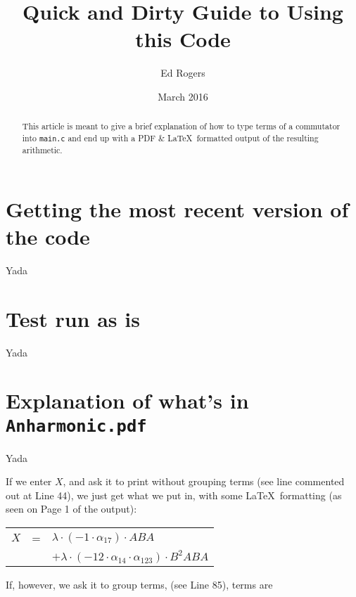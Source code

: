 \documentclass{article}
\title{Quick and Dirty Guide to Using this Code}
\author{Ed Rogers}
\date{March 2016}
\begin{document}
   \maketitle

\begin{abstract}
This article is meant to give a brief explanation of how to type terms of a commutator into \texttt{main.c} and end up with a PDF \& \LaTeX\ formatted output of the resulting arithmetic.
\end{abstract}

\section{Getting the most recent version of the code}
Yada

\section{Test run as is}
Yada

\section{Explanation of what's in \texttt{Anharmonic.pdf}}
Yada

If we enter $X$, and ask it to print without grouping terms (see line commented out at Line 44), we just get what we put in, with some \LaTeX\ formatting (as seen on Page 1 of the output): 
\begin{table}[!hp]
\begin{center}
\begin{tabular}{rcl}
$X$ & = & ${\lambda}{\cdot}(-1{\cdot}{\alpha}_{17}){\cdot}ABA$ \\
 & & $ + {\lambda}{\cdot}(-12{\cdot}{\alpha}_{14}{\cdot}{\alpha}_{123}){\cdot}B^{2}ABA$ \\
\end{tabular}
\end{center}
\end{table}

If, however, we ask it to group terms, (see Line 85), terms are

\newpage
\end{document}
